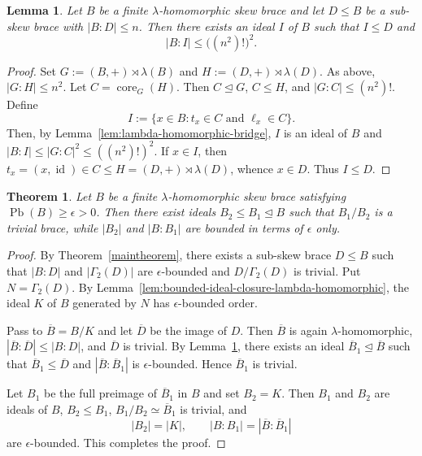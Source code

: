 \documentclass[10pt,a4paper]{amsart}
\numberwithin{equation}{section}
\newtheorem{lem}[equation]{Lemma}
\newtheorem{thm}[equation]{Theorem}
\newcommand{\Pb}{\operatorname{Pb} }
\begin{document}
\begin{lem}\label{lem:finite-index-ideal-core-lambda-homomorphic}
Let $B$ be a finite $\lambda$-homomorphic skew brace and let $D\leqslant B$ be a sub-skew brace with $|B:D|\leqslant n$. Then there exists an ideal $I$ of $B$ such that $I\leqslant D$ and
$$
|B:I|\leqslant\big((n^2)!\big)^2.
$$
\end{lem}

\begin{proof}
Set $G :=(B,+)\rtimes\lambda(B)$ and $H :=(D,+)\rtimes\lambda(D)$. As above, $|G:H|\leqslant n^2$. Let $C=\operatorname{core}_G(H)$. Then $C\unlhd G$, $C\leqslant H$, and $|G:C|\leqslant(n^2)!$. Define 
$$I :=\{x\in B:t_x\in C\text{ and }\ell_x\in C\}.$$
Then, by Lemma~\ref{lem:lambda-homomorphic-bridge}, $I$ is an ideal of $B$ and $|B:I|\leqslant |G:C|^2\leqslant((n^2)!)^2$. If $x\in I$, then $t_x=(x,\operatorname{id})\in C\leqslant H=(D,+)\rtimes\lambda(D)$, whence $x\in D$. Thus $I\leqslant D$.
\end{proof}

\begin{thm}\label{thm:bfc-ideals-lambda-homomorphic}
Let $B$ be a finite $\lambda$-homomorphic skew brace satisfying $\Pb(B)\geqslant\epsilon>0$. Then there exist ideals $B_2\leqslant B_1\trianglelefteq B$ such that $B_1/B_2$ is a trivial brace, while $|B_2|$ and $|B:B_1|$ are bounded in terms of $\epsilon$ only.
\end{thm}

\begin{proof}
By Theorem~\ref{maintheorem}, there exists a sub-skew brace $D\leqslant B$ such that $|B:D|$ and $|\Gamma_2(D)|$ are $\epsilon$-bounded and $D/\Gamma_2(D)$ is trivial. Put $N=\Gamma_2(D)$. By Lemma~\ref{lem:bounded-ideal-closure-lambda-homomorphic}, the ideal $K$ of $B$ generated by $N$ has $\epsilon$-bounded order.

Pass to $\overline B=B/K$ and let $\overline D$ be the image of $D$. Then $\overline B$ is again $\lambda$-homomorphic, $|\overline B:\overline D|\leqslant |B:D|$, and $\overline D$ is trivial. By Lemma~\ref{lem:finite-index-ideal-core-lambda-homomorphic}, there exists an ideal $\overline B_1\trianglelefteq\overline B$ such that $\overline B_1\leqslant\overline D$ and $|\overline B:\overline B_1|$ is $\epsilon$-bounded. Hence $\overline B_1$ is trivial.

Let $B_1$ be the full preimage of $\overline B_1$ in $B$ and set $B_2=K$. Then $B_1$ and $B_2$ are ideals of $B$, $B_2\leqslant B_1$, $B_1/B_2\simeq\overline B_1$ is trivial, and
$$
|B_2|=|K|,\qquad |B:B_1|=|\overline B:\overline B_1|
$$
are $\epsilon$-bounded. This completes the proof.
\end{proof}
\end{document}
